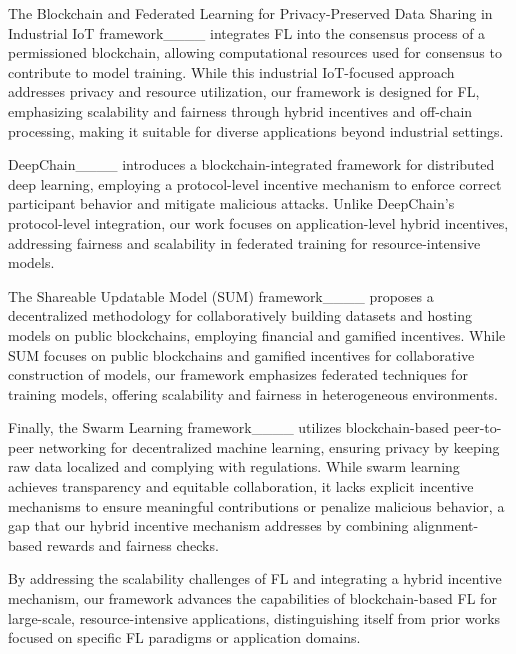 
The Blockchain and Federated Learning for Privacy-Preserved Data Sharing in Industrial IoT framework____ integrates FL into the consensus process of a permissioned blockchain, allowing computational resources used for consensus to contribute to model training. While this industrial IoT-focused approach addresses privacy and resource utilization, our framework is designed for FL, emphasizing scalability and fairness through hybrid incentives and off-chain processing, making it suitable for diverse applications beyond industrial settings.


DeepChain____ introduces a blockchain-integrated framework for distributed deep learning, employing a protocol-level incentive mechanism to enforce correct participant behavior and mitigate malicious attacks. Unlike DeepChain’s protocol-level integration, our work focuses on application-level hybrid incentives, addressing fairness and scalability in federated training for resource-intensive models.

The Shareable Updatable Model (SUM) framework____ proposes a decentralized methodology for collaboratively building datasets and hosting models on public blockchains, employing financial and gamified incentives. While SUM focuses on public blockchains and gamified incentives for collaborative construction of models, our framework emphasizes federated techniques for training models, offering scalability and fairness in heterogeneous environments.

Finally, the Swarm Learning  framework____ utilizes blockchain-based peer-to-peer networking for decentralized machine learning, ensuring privacy by keeping raw data localized and complying with regulations. While swarm learning achieves transparency and equitable collaboration, it lacks explicit incentive mechanisms to ensure meaningful contributions or penalize malicious behavior, a gap that our hybrid incentive mechanism addresses by combining alignment-based rewards and fairness checks.

By addressing the scalability challenges of FL and integrating a hybrid incentive mechanism, our framework advances the capabilities of blockchain-based FL for large-scale, resource-intensive applications, distinguishing itself from prior works focused on specific FL paradigms or application domains.

